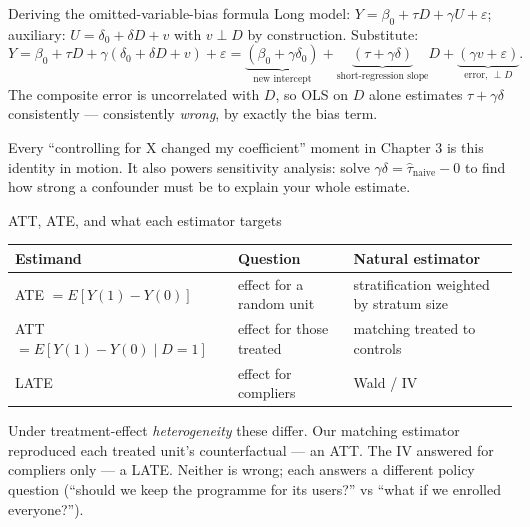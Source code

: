 \documentclass[aspectratio=169,11pt]{beamer}
\begin{document}
\begin{frame}{Deriving the omitted-variable-bias formula}
  \footnotesize
  Long model: $Y = \beta_0 + \tau D + \gamma U + \varepsilon$; auxiliary:
  $U = \delta_0 + \delta D + v$ with $v \perp D$ by construction. Substitute:
  \[
    Y = \beta_0 + \tau D + \gamma(\delta_0 + \delta D + v) + \varepsilon
      = \underbrace{(\beta_0 + \gamma\delta_0)}_{\text{new intercept}}
        + \underbrace{(\tau + \gamma\delta)}_{\text{short-regression slope}} D
        + \underbrace{(\gamma v + \varepsilon)}_{\text{error, } \perp D}.
  \]
  The composite error is uncorrelated with $D$, so OLS on $D$ alone estimates
  $\tau + \gamma\delta$ consistently --- consistently \emph{wrong}, by exactly the
  bias term.
  \begin{takeaway}
    Every ``controlling for X changed my coefficient'' moment in Chapter 3 is this
    identity in motion. It also powers sensitivity analysis: solve
    $\gamma\delta = \hat\tau_{\text{naive}} - 0$ to find how strong a confounder
    must be to explain your whole estimate.
  \end{takeaway}
\end{frame}

\begin{frame}{ATT, ATE, and what each estimator targets}
  \footnotesize
  \begin{center}
  \begin{tabular}{@{}lll@{}}
    \toprule
    \textbf{Estimand} & \textbf{Question} & \textbf{Natural estimator} \\
    \midrule
    ATE $= E[Y(1) - Y(0)]$ & effect for a random unit & stratification weighted by
    stratum size \\
    ATT $= E[Y(1) - Y(0) \mid D = 1]$ & effect for those treated & matching treated
    to controls \\
    LATE & effect for compliers & Wald / IV \\
    \bottomrule
  \end{tabular}
  \end{center}
  \begin{readme}
    Under treatment-effect \emph{heterogeneity} these differ. Our matching estimator
    reproduced each treated unit's counterfactual --- an ATT. The IV answered for
    compliers only --- a LATE. Neither is wrong; each answers a different policy
    question (``should we keep the programme for its users?'' vs ``what if we
    enrolled everyone?'').
  \end{readme}
\end{frame}
\end{document}
